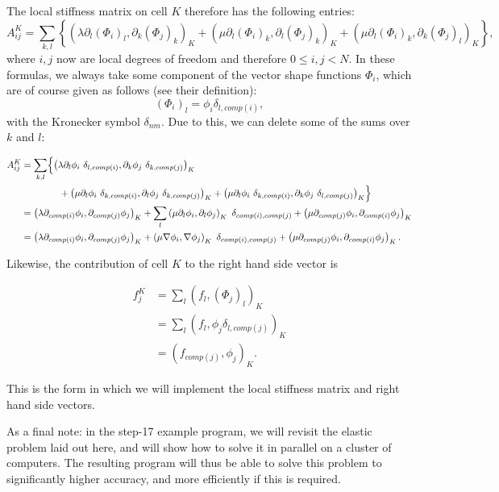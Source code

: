 \documentclass{article}
\begin{document}
The local stiffness matrix on cell $K$ therefore has the following entries:
$$
  A^K_{ij}
  =
  \sum_{k,l}
  \left\{
  \left(
    \lambda \partial_l (\Phi_i)_l, \partial_k (\Phi_j)_k
  \right)_K
  +
  \left(
    \mu \partial_l (\Phi_i)_k, \partial_l (\Phi_j)_k
  \right)_K
  +
  \left(
    \mu \partial_l (\Phi_i)_k, \partial_k (\Phi_j)_l
  \right)_K
  \right\},
$$
where $i,j$ now are local degrees of freedom and therefore $0\le i,j < N$. 
In these formulas, we always take some component of the vector shape functions
$\Phi_i$, which are of course given as follows (see their definition):
$$
  (\Phi_i)_l = \phi_i \delta_{l,comp(i)},
$$
with the Kronecker symbol $\delta_{nm}$. Due to this, we can delete some of
the sums over $k$ and $l$:
\begin{center}
\begin{align*}
  A^K_{ij}
  &=
  \sum_{k,l}
  \Bigl\{
  \left(
    \lambda \partial_l \phi_i\ \delta_{l,comp(i)}, 
            \partial_k \phi_j\ \delta_{k,comp(j)}
  \right)_K
\\
  &\qquad\qquad +
  \left(
    \mu \partial_l \phi_i\ \delta_{k,comp(i)},
        \partial_l \phi_j\ \delta_{k,comp(j)}
  \right)_K
  +
  \left(
    \mu \partial_l \phi_i\ \delta_{k,comp(i)},
        \partial_k \phi_j\ \delta_{l,comp(j)}
  \right)_K
  \Bigr\}
\\
  &=
  \left(
    \lambda \partial_{comp(i)} \phi_i,
            \partial_{comp(j)} \phi_j
  \right)_K
  +
  \sum_l
  \left(
    \mu \partial_l \phi_i,
        \partial_l \phi_j
  \right)_K
  \ \delta_{comp(i),comp(j)}
  +
  \left(
    \mu \partial_{comp(j)} \phi_i,
        \partial_{comp(i)} \phi_j
  \right)_K
\\
  &=
  \left(
    \lambda \partial_{comp(i)} \phi_i,
            \partial_{comp(j)} \phi_j
  \right)_K
  +
  \left(
    \mu \nabla \phi_i,
        \nabla \phi_j
  \right)_K
  \ \delta_{comp(i),comp(j)}
  +
  \left(
    \mu \partial_{comp(j)} \phi_i,
        \partial_{comp(i)} \phi_j
  \right)_K.
\end{align*}
\end{center}

Likewise, the contribution of cell $K$ to the right hand side vector is
\begin{center}
\begin{align*}
  f^K_j
  &=
  \sum_l
  \left(
    f_l,
    (\Phi_j)_l
  \right)_K
\\
  &=
  \sum_l
  \left(
    f_l,
    \phi_j \delta_{l,comp(j)}
  \right)_K
\\
  &=
  \left(
    f_{comp(j)},
    \phi_j
  \right)_K.
\end{align*}  
\end{center}

This is the form in which we will implement the local stiffness matrix and
right hand side vectors.

As a final note: in the step-17 example program, we will revisit the elastic
problem laid out here, and will show how to solve it in parallel on a cluster
of computers. The resulting program will thus be able to solve this problem to
significantly higher accuracy, and more efficiently if this is required.
\end{document}
